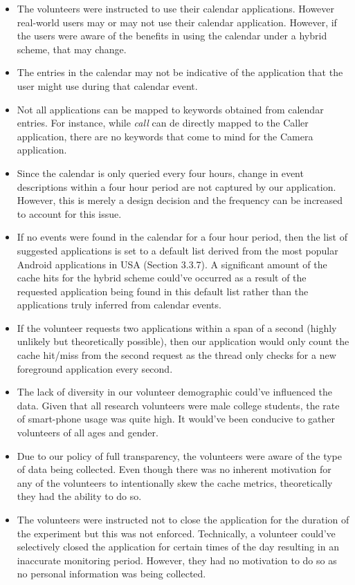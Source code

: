 \documentclass[12pt]{uthesis-v12}  %
\begin{document}
	\begin{itemize}
		\item The volunteers were instructed to use their calendar applications. However real-world users may or may not use their calendar application. However, if the users were aware of the benefits in using the calendar under a hybrid scheme, that may change.
		\item The entries in the calendar may not be indicative of the application that the user might use during that calendar event. 
		\item Not all applications can be mapped to keywords obtained from calendar entries. For instance, while {\em call} can de directly mapped to the Caller application, there are no keywords that come to mind for the Camera application.
		\item Since the calendar is only queried every four hours, change in event descriptions within a four hour period are not captured by our application. However, this is merely a design decision and the frequency can be increased to account for this issue. 
		\item If no events were found in the calendar for a four hour period, then the list of suggested applications is set to a default list derived from the most popular Android applications in USA (Section 3.3.7). A significant amount of the cache hits for the hybrid scheme could've occurred as a result of the requested application being found in this default list rather than the applications truly inferred from calendar events.
		\item If the volunteer requests two applications within a span of a second (highly unlikely but theoretically possible), then our application would only count the cache hit/miss from the second request as the thread only checks for a new foreground application every second.
		\item The lack of diversity in our volunteer demographic could've influenced the data. Given that all research volunteers were male college students, the rate of smart-phone usage was quite high. It would've been conducive to gather volunteers of all ages and gender.
		\item Due to our policy of full transparency, the volunteers were aware of the type of data being collected. Even though there was no inherent motivation for any of the volunteers to intentionally skew the cache metrics, theoretically they had the ability to do so. 
		\item The volunteers were instructed not to close the application for the duration of the experiment but this was not enforced. Technically, a volunteer could've selectively closed the application for certain times of the day resulting in an inaccurate monitoring period. However, they had no motivation to do so as no personal information was being collected.
	\end{itemize}  		
\end{document}
